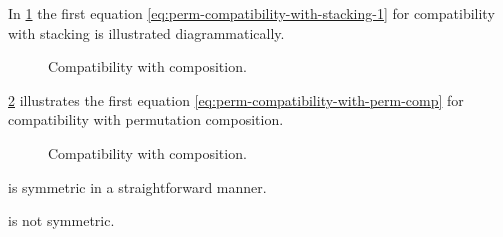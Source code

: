 In \cref{fig:compatibility-with-stacking} the first equation \cref{eq:perm-compatibility-with-stacking-1} for compatibility with stacking is illustrated diagrammatically.

\begin{figure}[h]
    \centering
     \qquad \qquad
    \caption{Compatibility with composition. }
    \label{fig:compatibility-with-stacking}
\end{figure}

\cref{fig:compatibility-perm-comp} illustrates the first equation \cref{eq:perm-compatibility-with-perm-comp} for compatibility with permutation composition.

\begin{figure}[h]
    \centering
     \qquad \qquad
    \caption{Compatibility with composition. }
    \label{fig:compatibility-perm-comp}
\end{figure}


\begin{example}
    \SetL is symmetric in a straightforward manner.
\end{example}

\begin{lemma}
    \label{lem:effects-not-symmetric}
    \Effects is not symmetric.
\end{lemma}


